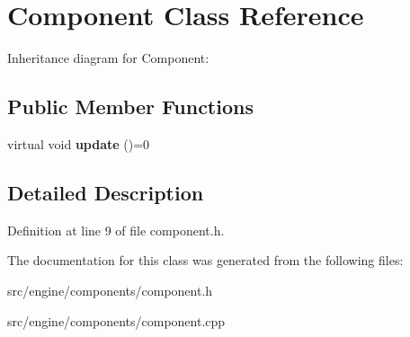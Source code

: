 \section{Component Class Reference}
\label{class_component}


Inheritance diagram for Component\+:
\subsection*{Public Member Functions}
\begin{DoxyCompactItemize}
\item 
\mbox{\label{class_component_a910086d9eda3ecb47d1117674ee99ea5}} 
virtual void {\bfseries update} ()=0
\end{DoxyCompactItemize}


\subsection{Detailed Description}


Definition at line 9 of file component.\+h.



The documentation for this class was generated from the following files\+:\begin{DoxyCompactItemize}
\item 
src/engine/components/component.\+h\item 
src/engine/components/component.\+cpp\end{DoxyCompactItemize}
